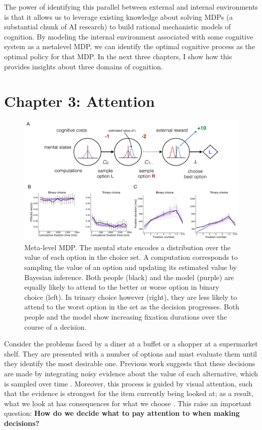 \documentclass[dsingle]{memo}
\begin{document}
The power of identifying this parallel between external and internal environments is that it allows us to leverage existing knowledge about solving MDPs (a substantial chunk of AI research) to build rational mechanistic models of cognition. By modeling the internal environment associated with some cognitive system as a metalevel MDP, we can identify the optimal cognitive process as the optimal policy for that MDP. In the next three chapters, I show how this provides insights about three domains of cognition.


\section{Chapter 3: Attention}

\begin{figure}[t!]
  \centering
  \includegraphics[width=\textwidth]{diagrams/precis/attention.pdf}
  \caption{
     Meta-level MDP. The mental state encodes a distribution over the value of each option in the choice set. A computation corresponds to sampling the value of an option and updating its estimated value by Bayesian inference.
     Both people (black) and the model (purple) are equally likely to attend to the better or worse option in binary choice (left). In trinary choice however (right), they are less likely to attend to the worst option in the set as the decision progresses.
     Both people and the model show increasing fixation durations over the course of a decision.
  }
  \label{fig:attention}
\end{figure}


Consider the problems faced by a diner at a buffet or a shopper at a supermarket shelf. They are presented with a number of options and must evaluate them until they identify the most desirable one. Previous work suggests that these decisions are made by integrating noisy evidence about the value of each alternative, which is sampled over time \citep{ratcliff2008diffusion,milosavljevic2010drift,usher2001time}. Moreover, this process is guided by visual attention, such that the evidence is strongest for the item currently being looked at; as a result, what we look at has consequences for what we choose \citep{shimojo2003gaze,armel2008biasing,krajbich2010visual}. This raise an important question: \textbf{How do we decide what to pay attention to when making decisions?}
\end{document}
